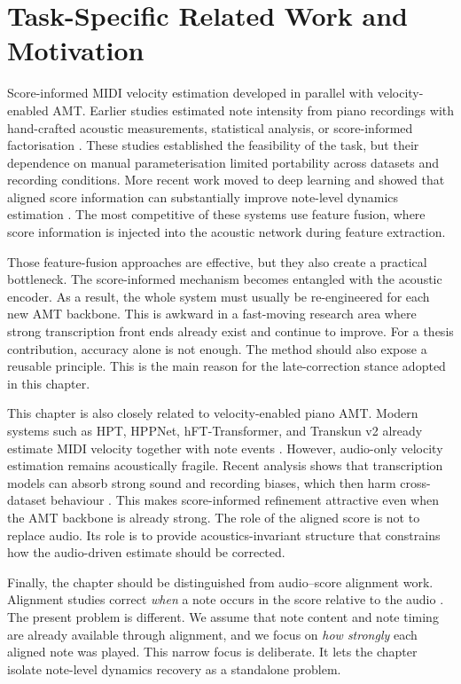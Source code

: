 \section{Task-Specific Related Work and Motivation}
\label{sec:scoreinf:related}

Score-informed MIDI velocity estimation developed in parallel with velocity-enabled AMT. Earlier studies estimated note intensity from piano recordings with hand-crafted acoustic measurements, statistical analysis, or score-informed factorisation \cite{dan2006psy,ewert2011est,jeong2017note,jeong2018timbre}. These studies established the feasibility of the task, but their dependence on manual parameterisation limited portability across datasets and recording conditions. More recent work moved to deep learning and showed that aligned score information can substantially improve note-level dynamics estimation \cite{kim2023score,kim2024method,kim2023diffvel}. The most competitive of these systems use feature fusion, where score information is injected into the acoustic network during feature extraction.

Those feature-fusion approaches are effective, but they also create a practical bottleneck. The score-informed mechanism becomes entangled with the acoustic encoder. As a result, the whole system must usually be re-engineered for each new AMT backbone. This is awkward in a fast-moving research area where strong transcription front ends already exist and continue to improve. For a thesis contribution, accuracy alone is not enough. The method should also expose a reusable principle. This is the main reason for the late-correction stance adopted in this chapter.

This chapter is also closely related to velocity-enabled piano AMT. Modern systems such as HPT, HPPNet, hFT-Transformer, and Transkun v2 already estimate MIDI velocity together with note events \cite{kong2021hpt,wei2022hppnet,toyama2023hft,yan2024semicrf}. However, audio-only velocity estimation remains acoustically fragile. Recent analysis shows that transcription models can absorb strong sound and recording biases, which then harm cross-dataset behaviour \cite{martak2026soundmusicbias}. This makes score-informed refinement attractive even when the AMT backbone is already strong. The role of the aligned score is not to replace audio. Its role is to provide acoustics-invariant structure that constrains how the audio-driven estimate should be corrected.

Finally, the chapter should be distinguished from audio--score alignment work. Alignment studies correct \emph{when} a note occurs in the score relative to the audio \cite{morsi2022bottlenecks,zeit2024align,chang2025rumaa}. The present problem is different. We assume that note content and note timing are already available through alignment, and we focus on \emph{how strongly} each aligned note was played. This narrow focus is deliberate. It lets the chapter isolate note-level dynamics recovery as a standalone problem.

